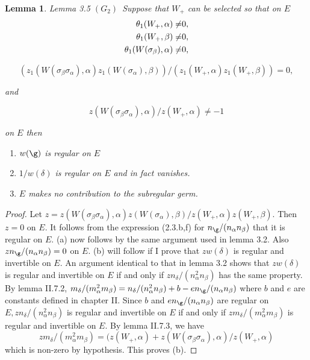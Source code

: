 \documentclass{memo-l}
\newtheorem{lemma}[theorem]{Lemma}
\theoremstyle{definition}
\theoremstyle{remark}
\numberwithin{section}{chapter}
\numberwithin{equation}{chapter}
\begin{document}
\begin{lemma}{Lemma 3.5}  $(G_{2})$\  Suppose that $W_{+}$ can be selected so that on 
$E$  
$$\aligned 
{\theta}_{1}(W_{+},{\alpha})\ne& 0, \\
{\theta}_{1}(W_{+},{\beta})\ne &0, \\ 
{\theta}_{1}(W({\sigma}_{\beta}),{\alpha})\ne& 0,
\endaligned$$

$$(z_{1}(W({\sigma}_{\beta}{\sigma}_{\alpha}),{\alpha})z_{1}
(W({\sigma}_{\alpha}),{\beta}))/(z_{1}(W_{+},{\alpha})z_{1}(W_{+},
{\beta})) = 0,
$$

and

$$
z(W({\sigma}_{\beta}{\sigma}_{\alpha}),{\alpha})/z(W_{+},{\alpha}) \ne  -1
$$ 

on $E$ then
\begin{enumerate}[label=\alph*)]
\item $w({\g})$ is regular on $E$
\item $1/w({\delta})$ is regular on $E$ and in fact vanishes.
\item $E$ makes no contribution to the subregular germ.
\end{enumerate}
\end{lemma}

\medskip

\begin{proof}    Let $z = z(W({\sigma}_{\beta}{\sigma}_{\alpha}),
{\alpha})z(W({\sigma}_{\alpha}),{\beta})/z(W_{+},{\alpha})z(W_{+},{\beta})$. 
 Then $z = 0$ on $E$. 
 It follows from the expression (2.3.b,f) for $n_{{\g}}/(n_{\alpha}
n_{\beta})$ that it is regular on $E$. 
(a) now follows by the same argument used in lemma 3.2. 
 Also $zn_{{\g}}/(n_{\alpha}n_{\beta}) = 0$ on $E$. 
(b) will follow if I prove that $zw({\delta})$ is regular and
invertible on $E$. 
 An argument identical to that in lemma 3.2 shows that $zw({\delta})$ is 
regular and invertible on $E$ if and only if $zn_{{\delta}}/(n_{\alpha}^{2}
n_{\beta})$ has the same property. 
 By lemma II.7.2, $m_{{\delta}}/(m_{\alpha}^{2}m_{\beta}) = 
n_{{\delta}}/(n_{\alpha}^{2}n_{\beta}) + b - en_{{\g}}/(n_{\alpha}
n_{\beta})$ where $b$ and $e$ are constants defined in chapter II. 
 Since $b$ and $en_{{\g}}/(n_{\alpha}n_{\beta})$ are regular on $E, 
zn_{{\delta}}/(n_{\alpha}^{2}n_{\beta})$ is regular and invertible on $E$ 
if and only if $zm_{{\delta}}/(m_{\alpha}^{2}m_{\beta})$ is regular and 
invertible on $E$. 
 By lemma II.7.3, we have
$$
zm_{{\delta}}/(m_{\alpha}^{2}m_{\beta}) = (z(W_{+},{\alpha})+
z(W({\sigma}_{\beta}{\sigma}_{\alpha}),{\alpha})/z(W_{+},{\alpha})
$$ 
which is non-zero by hypothesis.  This proves (b).
\end{proof} 
\end{document}
